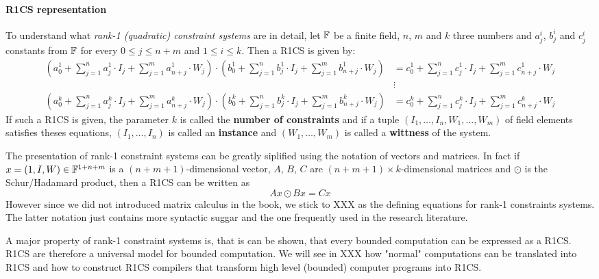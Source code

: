 \paragraph{R1CS representation} To understand what \textit{rank-1 (quadratic) constraint systems} are in detail, let $\mathbb{F}$ be a finite field, $n$, $m$ and $k$ three numbers and $a_j^i$, $b_j^i$ and $c_j^i$ constants from $\mathbb{F}$ for every $0\leq j \leq n+m$ and $1\leq i \leq k$. Then a R1CS is given by: 
\begin{align*}
\scriptstyle\left(a^1_0 + \sum_{j=1}^n a^1_j \cdot I_j + \sum_{j=1}^m a^1_{n+j} \cdot W_j  \right) \cdot 
\left(b^1_0 + \sum_{j=1}^n b^1_j \cdot I_j + \sum_{j=1}^m b^1_{n+j} \cdot W_j  \right) &= 
\scriptstyle c^1_0 + \sum_{j=1}^n c^1_j \cdot I_j + \sum_{j=1}^m c^1_{n+j} \cdot W_j\\
       & \vdots\\
\scriptstyle\left(a^k_0 + \sum_{j=1}^n a^k_j \cdot I_j + \sum_{j=1}^m a^k_{n+j} \cdot W_j  \right) \cdot 
\left(b^k_0 + \sum_{j=1}^n b^k_j \cdot I_j + \sum_{j=1}^m b^k_{n+j} \cdot W_j  \right) &= 
\scriptstyle c^k_0 + \sum_{j=1}^n c^k_j \cdot I_j + \sum_{j=1}^m c^k_{n+j} \cdot W_j       
\end{align*}
If such a R1CS is given, the parameter $k$ is called the \textbf{number of constraints} and if a tuple $(I_1,\ldots, I_n,W_1,\ldots,W_m)$ of field elements satisfies theses equations, $(I_1,\ldots, I_n)$ is called an \textbf{instance} and $(W_1,\ldots,W_m)$ is called a \textbf{wittness} of the system.

\begin{remark} The presentation of rank-1 constraint systems can be greatly siplified using the notation of vectors and matrices. In fact if
$x= (1,I,W)\in \mathbb{F}^{1+n+m}$ is a $(n+m+1)$-dimensional vector, $A$, $B$, $C$ are $(n+m+1)\times k$-dimensional matrices and $\odot$ is the Schur/Hadamard product, then a R1CS can be written as
$$
Ax \odot Bx = Cx
$$
However since we did not introduced matrix calculus in the book, we stick to XXX as the defining equations for rank-1 constraints systems. The latter notation just contains more syntactic suggar and the one frequently used in the research literature.
\end{remark}
A major property of rank-1 constraint systems is, that is can be shown, that every bounded computation can be expressed as a R1CS. R1CS are therefore a universal model for bounded computation. We will see in XXX how "normal" computations can be translated into R1CS and how to construct R1CS compilers that transform high level (bounded) computer programs into R1CS.


